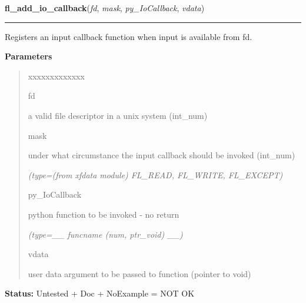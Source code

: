 \hspace{.8\funcindent}\begin{boxedminipage}{\funcwidth}

    \raggedright \textbf{fl\_add\_io\_callback}(\textit{fd}, \textit{mask}, \textit{py\_IoCallback}, \textit{vdata})

    \vspace{-1.5ex}

    \rule{\textwidth}{0.5\fboxrule}
\setlength{\parskip}{2ex}
    Registers an input callback function when input is available from fd.

\setlength{\parskip}{1ex}
      \textbf{Parameters}
      \vspace{-1ex}

      \begin{quote}
        \begin{Ventry}{xxxxxxxxxxxxx}

          \item[fd]

          a valid file descriptor in a unix system (int\_num)

          \item[mask]

          under what circumstance the input callback should be invoked 
          (int\_num)

            {\it (type=(from xfdata module) FL\_READ, FL\_WRITE, FL\_EXCEPT)}

          \item[py\_IoCallback]

          python function to be invoked - no return

            {\it (type=\_\_ funcname (num, ptr\_void) \_\_)}

          \item[vdata]

          user data argument to be passed to function (pointer to void)

        \end{Ventry}

      \end{quote}

\textbf{Status:} Untested + Doc + NoExample = NOT OK



    \end{boxedminipage}

    \label{xformslib:library:fl_remove_io_callback}

